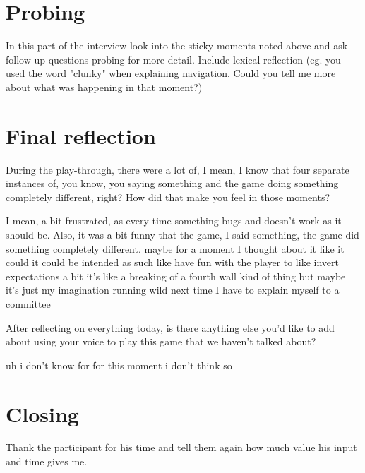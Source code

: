 \section{Probing}
In this part of the interview look into the sticky moments noted above and ask follow-up questions probing for more detail.
Include lexical reflection (eg. you used the word "clunky" when explaining navigation. Could you tell me more about what was happening
in that moment?)


\section{Final reflection}

\begin{QandA}
   \item During the play-through, there were a lot of, I mean, I know that four separate instances of, you know, you saying something and the game doing something completely different, right? How did that make you feel in those moments?
         \begin{answered}
            I mean, a bit frustrated, as every time something bugs and doesn't work as it should be.
            Also, it was a bit funny that the game, I said something, the game did something completely different.
            maybe for a moment I thought about it like it could it could be intended as such like have fun with the player to like invert expectations a bit it's like a breaking of a fourth wall kind of thing but maybe it's just my imagination running wild next time I have to explain myself to a committee
         \end{answered}

   \item After reflecting on everything today, is there anything else you’d like to add about using your voice to play this game that we haven't talked about?

         \begin{answered}
            uh i don't know for for this moment i don't think so
         \end{answered}
\end{QandA}

\section{Closing}
Thank the participant for his time and tell them again how much value his input and time gives me.







